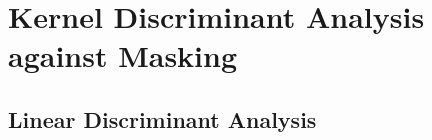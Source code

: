 \section{Kernel Discriminant Analysis against Masking}


\subsection{Linear Discriminant Analysis}





